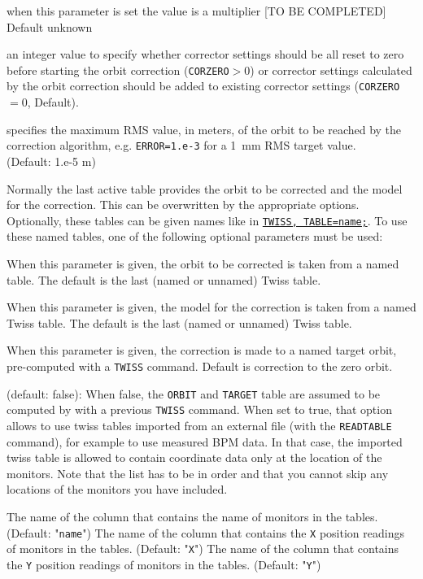 \begin{madlist}
    when this parameter is set the value is a multiplier [TO BE COMPLETED] 
     \\ Default unknown

    an integer value to specify whether corrector settings 
     should be all reset to zero before starting the orbit correction 
     (\texttt{CORZERO}$>0$) 
     or corrector settings calculated by the orbit correction should be added to 
     existing corrector settings (\texttt{CORZERO}$=0$, Default).

    specifies the maximum RMS value, in meters, of the 
     orbit to be reached by the correction algorithm, 
     e.g. \texttt{ERROR=1.e-3} for a 1~mm RMS target value. 
     \\ (Default: 1.e-5 m)

\end{madlist}

Normally the last active table provides the orbit to be
corrected and the model for the correction. This can be overwritten
by the appropriate options. Optionally, these tables can be given
names like in \hyperref[chap:twiss]{\texttt{TWISS, TABLE=name;}}. 
To use these named tables, one of the following optional
parameters must be  used:  

\begin{madlist}
    When this parameter is given, the orbit to be corrected
     is taken from a named table. The default is the last (named or
     unnamed) Twiss table.  

    When this parameter is given, the model for the
     correction is taken from a named Twiss table. The default is the
     last (named or unnamed) Twiss table.  

    When this parameter is given, the correction is made to
     a named target orbit, pre-computed with a \texttt{TWISS} command. Default is
     correction to the zero orbit.  

    (default: false): When false, the \texttt{ORBIT} and 
     \texttt{TARGET} table
     are assumed to be computed by \mad with a previous \texttt{TWISS}
     command. When set to true, that option allows to use twiss tables
     imported from an external file (with the \texttt{READTABLE} command), for
     example to use measured BPM data. In that case, the imported twiss
     table is allowed to contain coordinate data only at the location of
     the monitors. Note that the list has to be in order and that you
     cannot skip any locations of the monitors you have included. 
     
    The name of the column that contains the name of 
     monitors in the tables. (Default: "\texttt{name}")
    The name of the column that contains the \texttt{X} position 
     readings of monitors in the tables. (Default: "\texttt{X}")
    The name of the column that contains the \texttt{Y} position 
     readings of monitors in the tables. (Default: "\texttt{Y}")
     
\end{madlist}

